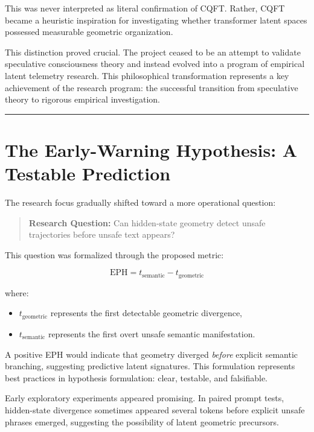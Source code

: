 \documentclass[12pt,a4paper]{article}
\begin{document}
This was never interpreted as literal confirmation of CQFT. Rather, CQFT became a heuristic inspiration for investigating whether transformer latent spaces possessed measurable geometric organization.

This distinction proved crucial. The project ceased to be an attempt to validate speculative consciousness theory and instead evolved into a program of empirical latent telemetry research. This philosophical transformation represents a key achievement of the research program: the successful transition from speculative theory to rigorous empirical investigation.

\medskip
\hrule
\medskip

\section{The Early-Warning Hypothesis: A Testable Prediction}

The research focus gradually shifted toward a more operational question:

\begin{quote}
\textbf{Research Question:} Can hidden-state geometry detect unsafe trajectories before unsafe text appears?
\end{quote}

This question was formalized through the proposed metric:

\begin{equation}
\text{EPH} = t_{\text{semantic}} - t_{\text{geometric}}
\end{equation}

where:
\begin{itemize}
    \item $t_{\text{geometric}}$ represents the first detectable geometric divergence,
    \item $t_{\text{semantic}}$ represents the first overt unsafe semantic manifestation.
\end{itemize}

A positive EPH would indicate that geometry diverged \emph{before} explicit semantic branching, suggesting predictive latent signatures. This formulation represents best practices in hypothesis formulation: clear, testable, and falsifiable.

Early exploratory experiments appeared promising. In paired prompt tests, hidden-state divergence sometimes appeared several tokens before explicit unsafe phrases emerged, suggesting the possibility of latent geometric precursors.
\end{document}

